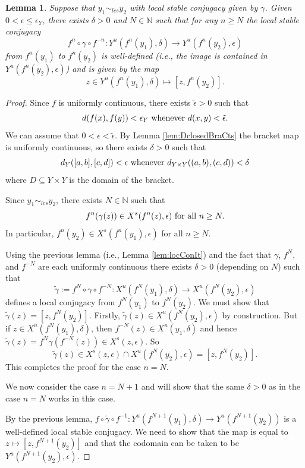 \documentclass{amsart}
\newcommand{\N}{\mathbb{N}}
\theoremstyle{plain}
\newtheorem{lemma}[theorem]{Lemma}
\theoremstyle{definition}
\theoremstyle{remark}
\begin{document}
\begin{lemma} \label{lem:LSCforN}
Suppose that $y_1 \sim_{lcs} y_2$ with local stable conjugacy given by $\gamma$. Given $0<\epsilon\leq \epsilon_Y$, there exists $\delta>0$ and $N\in \N$ such that for any $n\ge N$ the local stable conjugacy 
\[  f^n \circ \gamma \circ f^{-n} : Y^u( f^n(y_1), \delta) \rightarrow Y^u(f^n(y_2), \epsilon) \]
from $f^n(y_1)$ to $f^n(y_2)$ is well-defined (i.e., the image is contained in $Y^u(f^n(y_2), \epsilon)$) and is given by the map
\[ z \in Y^u( f^n(y_1), \delta) \mapsto [z, f^n(y_2)]. \]
\end{lemma}
\begin{proof}
Since $f$ is uniformly continuous, there exists $\tilde{\epsilon}>0$ such that
\[ d(f(x), f(y)) < \epsilon_{Y} \hbox{ whenever }d(x,y)< \tilde{\epsilon}. \]
We can assume that $0< \epsilon < \tilde{\epsilon}$. By Lemma \ref{lem:DclosedBraCts} the bracket map is uniformly continuous, so there exists $\delta>0$ such that 
\[ d_Y([a, b], [c, d]) < \epsilon \hbox{ whenever }d_{Y\times Y}((a, b), (c, d))< \delta \]
where $D \subseteq Y \times Y$ is the domain of the bracket.

Since $y_1 \sim_{lcs} y_2$, there exists $N\in \N$ such that
\[ f^n(\gamma(z)) \in X^s(f^n(z), \epsilon) \hbox{ for all }n \ge N. \]
In particular, $f^{n}(y_2) \in X^s(f^n(y_1), \epsilon)$ for all $n \ge N$.

Using the previous lemma (i.e., Lemma \ref{lem:locConIt}) and the fact that $\gamma$, $f^N$, and $f^{-N}$ are each uniformly continuous there exists $\delta>0$ (depending on $N$) such that
\[
\tilde{\gamma}:= f^N \circ \gamma \circ f^{-N} : X^u(f^N(y_1), \delta) \rightarrow X^u(f^N(y_2), \epsilon)
\]
defines a local conjugacy from $f^N(y_1)$ to $f^N(y_2)$. We must show that $\tilde{\gamma}(z)=[z, f^N(y_2)]$. Firstly, $\tilde{\gamma}(z) \in X^u(f^N(y_2), \epsilon)$ by construction. But if $z\in X^u(f^N(y_1), \delta)$, then $f^{-N}(z) \in X^u(y_1, \delta)$ and hence 
$\tilde{\gamma}(z)=f^N\gamma(f^{-N}(z)) \in X^s(z, \epsilon)$. So 
\[ \tilde{\gamma}(z) \in X^s(z, \epsilon) \cap X^u(f^N(y_2), \epsilon) = [ z, f^N(y_2)]. \]
This completes the proof for the case $n=N$. 

We now consider the case $n=N+1$ and will show that the same $\delta>0$ as in the case $n=N$ works in this case. 

By the previous lemma, $f \circ \tilde{\gamma}\circ f^{-1} : Y^u(f^{N+1}(y_1), \delta) \rightarrow Y^u(f^{N+1}(y_2))$ is a well-defined local stable conjugacy. We need to show that the map is equal to $z \mapsto [z, f^{N+1}(y_2)]$ and that the codomain can be taken to be $Y^u(f^{N+1}(y_2), \epsilon)$. 


\end{proof}
\end{document}

